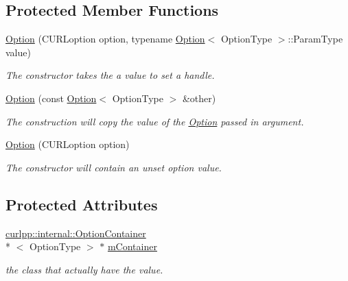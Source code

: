 \subsection*{Protected Member Functions}
\begin{DoxyCompactItemize}
\item 
\hypertarget{classcurlpp_1_1Option_a4fdf55cf8f735e44a0a39c617f0e641b}{\hyperlink{classcurlpp_1_1Option_a4fdf55cf8f735e44a0a39c617f0e641b}{Option} (C\-U\-R\-Loption option, typename \hyperlink{classcurlpp_1_1Option}{Option}$<$ Option\-Type $>$\-::Param\-Type value)}\label{classcurlpp_1_1Option_a4fdf55cf8f735e44a0a39c617f0e641b}

\begin{DoxyCompactList}\small\item\em The constructor takes the a value to set a handle. \end{DoxyCompactList}\item 
\hypertarget{classcurlpp_1_1Option_a35d366e9aa8649632b298bb1c42acde3}{\hyperlink{classcurlpp_1_1Option_a35d366e9aa8649632b298bb1c42acde3}{Option} (const \hyperlink{classcurlpp_1_1Option}{Option}$<$ Option\-Type $>$ \&other)}\label{classcurlpp_1_1Option_a35d366e9aa8649632b298bb1c42acde3}

\begin{DoxyCompactList}\small\item\em The construction will copy the value of the \hyperlink{classcurlpp_1_1Option}{Option} passed in argument. \end{DoxyCompactList}\item 
\hyperlink{classcurlpp_1_1Option_a86f7d7bf4ce8ebd8448c0a4658b521ee}{Option} (C\-U\-R\-Loption option)
\begin{DoxyCompactList}\small\item\em The constructor will contain an unset option value. \end{DoxyCompactList}\end{DoxyCompactItemize}
\subsection*{Protected Attributes}
\begin{DoxyCompactItemize}
\item 
\hypertarget{classcurlpp_1_1Option_a11963364bc30eccdbc9ae00e502014e7}{\hyperlink{classcurlpp_1_1internal_1_1OptionContainer}{curlpp\-::internal\-::\-Option\-Container}\\*
$<$ Option\-Type $>$ $\ast$ \hyperlink{classcurlpp_1_1Option_a11963364bc30eccdbc9ae00e502014e7}{m\-Container}}\label{classcurlpp_1_1Option_a11963364bc30eccdbc9ae00e502014e7}

\begin{DoxyCompactList}\small\item\em the class that actually have the value. \end{DoxyCompactList}\end{DoxyCompactItemize}


